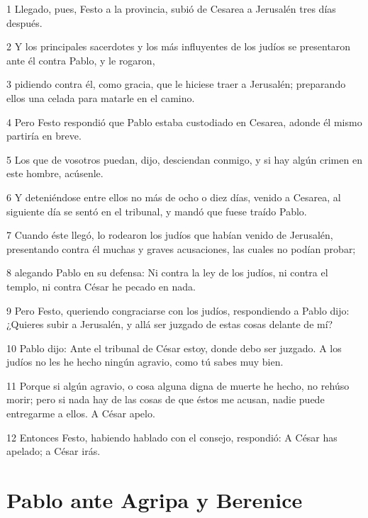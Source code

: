 \par 1 Llegado, pues, Festo a la provincia, subió de Cesarea a Jerusalén tres días después.
\par 2 Y los principales sacerdotes y los más influyentes de los judíos se presentaron ante él contra Pablo, y le rogaron,
\par 3 pidiendo contra él, como gracia, que le hiciese traer a Jerusalén; preparando ellos una celada para matarle en el camino.
\par 4 Pero Festo respondió que Pablo estaba custodiado en Cesarea, adonde él mismo partiría en breve.
\par 5 Los que de vosotros puedan, dijo, desciendan conmigo, y si hay algún crimen en este hombre, acúsenle.
\par 6 Y deteniéndose entre ellos no más de ocho o diez días, venido a Cesarea, al siguiente día se sentó en el tribunal, y mandó que fuese traído Pablo.
\par 7 Cuando éste llegó, lo rodearon los judíos que habían venido de Jerusalén, presentando contra él muchas y graves acusaciones, las cuales no podían probar;
\par 8 alegando Pablo en su defensa: Ni contra la ley de los judíos, ni contra el templo, ni contra César he pecado en nada.
\par 9 Pero Festo, queriendo congraciarse con los judíos, respondiendo a Pablo dijo: ¿Quieres subir a Jerusalén, y allá ser juzgado de estas cosas delante de mí?
\par 10 Pablo dijo: Ante el tribunal de César estoy, donde debo ser juzgado. A los judíos no les he hecho ningún agravio, como tú sabes muy bien.
\par 11 Porque si algún agravio, o cosa alguna digna de muerte he hecho, no rehúso morir; pero si nada hay de las cosas de que éstos me acusan, nadie puede entregarme a ellos. A César apelo.
\par 12 Entonces Festo, habiendo hablado con el consejo, respondió: A César has apelado; a César irás.

\section*{Pablo ante Agripa y Berenice}

